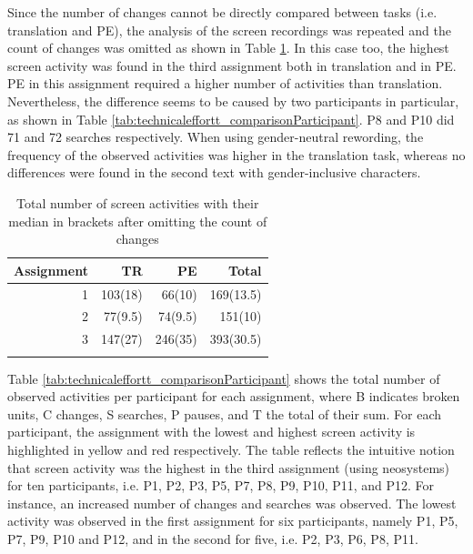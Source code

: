 Since the number of changes cannot be directly compared between tasks (i.e. translation and PE), the analysis of the screen recordings was repeated and the count of changes was omitted as shown in Table \ref{tab:technicaleffort_nochanges}. In this case too, the highest screen activity was found in the third assignment both in translation and in PE. PE in this assignment required a higher number of activities than translation. Nevertheless, the difference seems to be caused by two participants in particular, as shown in Table \ref{tab:technicaleffortt_comparisonParticipant}. P8 and P10 did 71 and 72 searches respectively. When using gender-neutral rewording, the frequency of the observed activities was higher in the translation task, whereas no differences were found in the second text with gender-inclusive characters. 

\begin{table}[ht]
    \caption{Total number of screen activities with their median in brackets after omitting the count of changes}
    \centering
    \begin{tabular}{rrrr}
    \lsptoprule
       \textbf{Assignment} & \textbf{TR} & \textbf{PE} & \textbf{Total} \\
       \midrule
        1 & 103(18) & 66(10) & 169(13.5) \\ 
        2 & 77(9.5) & 74(9.5) & 151(10) \\ 
        3 & 147(27) & 246(35) & 393(30.5) \\
\lspbottomrule
    \end{tabular}
    \label{tab:technicaleffort_nochanges}
\end{table}

Table \ref{tab:technicaleffortt_comparisonParticipant} shows the total number of observed activities per participant for each assignment, where B indicates broken units, C changes, S searches, P pauses, and T the total of their sum. For each participant, the assignment with the lowest and highest screen activity is highlighted in yellow and red respectively. The table reflects the intuitive notion that screen activity was the highest in the third assignment (using neosystems) for ten participants, i.e. P1, P2, P3, P5, P7, P8, P9, P10, P11, and P12. For instance, an increased number of changes and searches was observed. The lowest activity was observed in the first assignment for six participants, namely P1, P5, P7, P9, P10 and P12, and in the second for five, i.e. P2, P3, P6, P8, P11.



